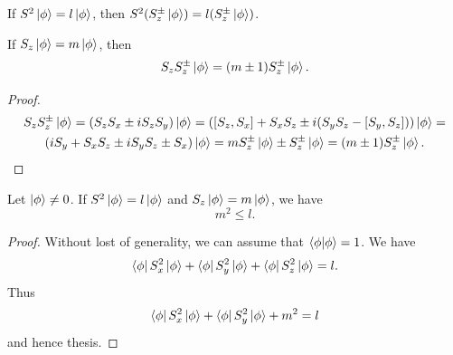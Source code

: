 \documentclass[main.tex]{subfiles}
\begin{document}
\begin{corollary}
\label{spin-create-anihilate-in-space}
If $S^2\ket{\phi} = l \ket{\phi}$, then $S^2(S^{\pm}_z\ket{\phi}) = l(S^{\pm}_z\ket{\phi})$.  
\end{corollary}

\begin{proposition}
\label{spin-creation-in-act}
If $S_z\ket{\phi} = m\ket{\phi}$, then
\begin{equation}
S_z S_z^\pm \ket{\phi} = (m \pm 1) S_z^\pm \ket{\phi}.
\end{equation}
\end{proposition}
\begin{proof}
\begin{multline*}
S_z S_z^\pm \ket{\phi} = (S_zS_x \pm iS_zS_y) \ket{\phi}
= ([S_z, S_x] + S_x S_z \pm i(S_y S_z - [S_y, S_z])) \ket{\phi} = \\
(iS_y + S_x S_z \pm iS_y S_z \pm S_x) \ket{\phi} = mS^{\pm}_z \ket{\phi} \pm S^{\pm}_z \ket{\phi} = (m \pm 1) S_z^\pm \ket{\phi}.\\
\end{multline*}
\end{proof}


\begin{proposition}
\label{limit-for-spin}
Let $\ket{\phi}\not = 0$.
If $S^2 \ket{\phi} = l\ket{\phi}$ and $S_z\ket{\phi} = m\ket{\phi}$, we have
\begin{equation}
m^2 \leq l.
\end{equation}
\end{proposition}
\begin{proof}
Without lost of generality, we can assume that $\bra{\phi}\ket{\phi} = 1$.
We have
\begin{equation}
\bra{\phi}S^2_x\ket{\phi} + \bra{\phi}S^2_y\ket{\phi} + \bra{\phi}S^2_z\ket{\phi} = l.
\end{equation}
Thus
\begin{equation}
\bra{\phi}S^2_x\ket{\phi} + \bra{\phi}S^2_y\ket{\phi} + m^2 = l
\end{equation}
and hence thesis.
\end{proof}
\end{document}
